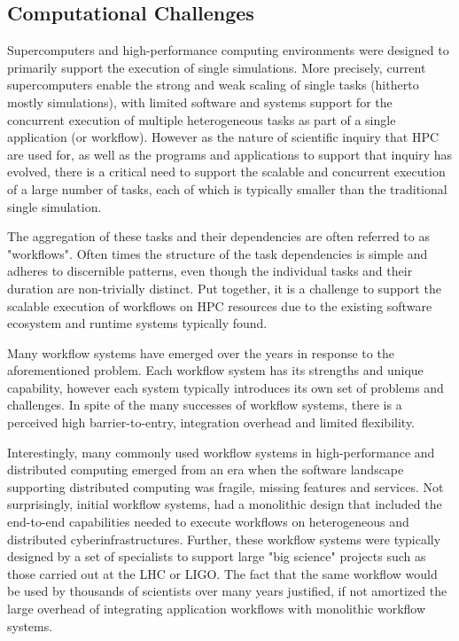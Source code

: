 
\subsection{Computational Challenges}

Supercomputers and high-performance computing environments were designed to
primarily support the execution of single simulations. More precisely, current
supercomputers enable the strong and weak scaling of single tasks (hitherto
mostly simulations), with limited software and systems support for the
concurrent execution of multiple heterogeneous tasks as part of a single
application (or workflow). However as the nature of scientific inquiry that
HPC are used for, as well as the programs and applications to support that
inquiry has evolved, there is a critical need to support the scalable and
concurrent execution of a large number of tasks, each of which is typically
smaller than the traditional single simulation.

The aggregation of these tasks and their dependencies are often referred to as
"workflows". Often times the structure of the task dependencies is simple and
adheres to discernible patterns, even though the individual tasks and their
duration are non-trivially distinct. Put together, it is a challenge to
support the scalable execution of workflows on HPC resources due to the
existing software ecosystem and runtime systems typically found.

Many workflow systems have emerged over the years in response to the
aforementioned problem. Each workflow system has its strengths and unique
capability, however each system typically introduces its own set of problems
and challenges. In spite of the many successes of workflow systems, there is a
perceived high barrier-to-entry, integration overhead and limited flexibility.

Interestingly, many commonly used workflow systems in high-performance and
distributed computing emerged from an era when the software landscape
supporting distributed computing was fragile, missing features and services.
Not surprisingly, initial workflow systems, had a monolithic design that
included the end-to-end capabilities needed to execute workflows on
heterogeneous and distributed cyberinfrastructures. Further, these workflow
systems were typically designed by a set of specialists to support large "big
science" projects such as those carried out at the LHC or LIGO. The fact that
the same workflow would be used by thousands of scientists over many years
justified, if not amortized the large overhead of integrating application
workflows with monolithic workflow systems.


